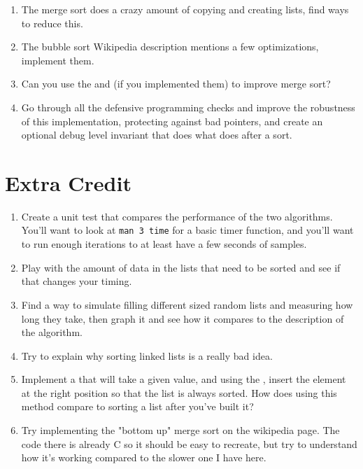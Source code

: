 \begin{enumerate}
\item The merge sort does a crazy amount of copying and creating lists, find ways to reduce this.
\item The bubble sort Wikipedia description mentions a few optimizations, implement them.
\item Can you use the  and  (if you implemented them) to improve merge sort?
\item Go through all the defensive programming checks and improve the robustness of
    this implementation, protecting against bad  pointers, and create
    an optional debug level invariant that does what  does
    after a sort.
\end{enumerate}

\section{Extra Credit}

\begin{enumerate}
\item Create a unit test that compares the performance of the two algorithms.  You'll want to look at \verb|man 3 time| for a basic timer function,
    and you'll want to run enough iterations to at least have a few seconds of samples.
\item Play with the amount of data in the lists that need to be sorted and see if that changes your timing.
\item Find a way to simulate filling different sized random lists and measuring how long they take, then graph it and see how it compares to the
    description of the algorithm.
\item Try to explain why sorting linked lists is a really bad idea.
\item Implement a  that will take a given value, and using the , insert the element at the
    right position so that the list is always sorted.  How does using this method compare to sorting a list after you've built it?
\item Try implementing the "bottom up" merge sort on the wikipedia page.  The code there is already C so it should be easy to 
    recreate, but try to understand how it's working compared to the slower one I have here.
\end{enumerate}

